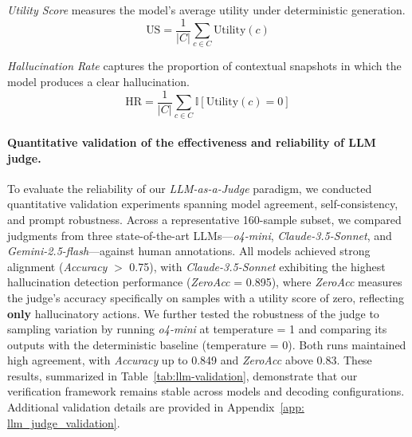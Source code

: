 \textit{Utility Score} measures the model's average utility under deterministic generation.
\begin{equation}
\text{US} = \frac{1}{|C|}\sum_{c \in C} \text{Utility}(c)
\end{equation}


\textit{Hallucination Rate} captures the proportion of contextual snapshots in which the model produces a clear hallucination.
\begin{equation}
\text{HR} = \frac{1}{|C|} \sum_{c \in C} \mathbb{I}[\text{Utility}(c) = 0]
\end{equation}

\paragraph{Quantitative validation of the effectiveness and reliability of LLM judge.}
To evaluate the reliability of our \textit{LLM-as-a-Judge} paradigm, we conducted quantitative validation experiments spanning model agreement, self-consistency, and prompt robustness. Across a representative 160-sample subset, we compared judgments from three state-of-the-art LLMs---\textit{o4-mini}, \textit{Claude-3.5-Sonnet}, and \textit{Gemini-2.5-flash}---against human annotations. All models achieved strong alignment (\textit{Accuracy} $>$ 0.75), with \textit{Claude-3.5-Sonnet} exhibiting the highest hallucination detection performance (\textit{ZeroAcc} = 0.895), where \textit{ZeroAcc} measures the judge's accuracy specifically on samples with a utility score of zero, reflecting \textbf{only} hallucinatory actions. We further tested the robustness of the judge to sampling variation by running \textit{o4-mini} at temperature = 1 and comparing its outputs with the deterministic baseline (temperature = 0). Both runs maintained high agreement, with \textit{Accuracy} up to 0.849 and \textit{ZeroAcc} above 0.83. These results, summarized in Table~\ref{tab:llm-validation}, demonstrate that our verification framework remains stable across models and decoding configurations. Additional validation details are provided in Appendix~\ref{app: llm_judge_validation}.
\vspace{-3mm}


